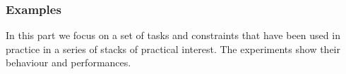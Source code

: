 

\subsubsection{Examples}
In this part we focus on a set of tasks and constraints that have been used in practice in a series of stacks of practical interest. The experiments show their behaviour and performances.

